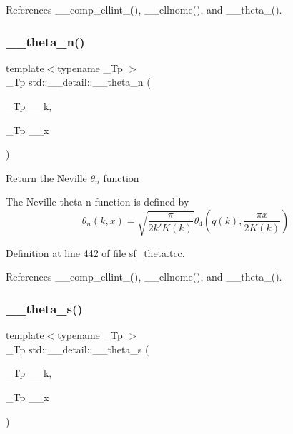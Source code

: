 References \+\_\+\+\_\+comp\+\_\+ellint\+\_(), \+\_\+\+\_\+ellnome(), and \+\_\+\+\_\+theta\+\_().

\mbox{\label{namespacestd_1_1____detail_aace76210c8f70761bb14ab602b88d027}} 
\subsubsection{\texorpdfstring{\+\_\+\+\_\+theta\+\_\+n()}{\_\_theta\_n()}}
{\footnotesize\ttfamily template$<$typename \+\_\+\+Tp $>$ \\
\+\_\+\+Tp std\+::\+\_\+\+\_\+detail\+::\+\_\+\+\_\+theta\+\_\+n (\begin{DoxyParamCaption}\item[{\+\_\+\+Tp}]{\+\_\+\+\_\+k,  }\item[{\+\_\+\+Tp}]{\+\_\+\+\_\+x }\end{DoxyParamCaption})}

Return the Neville $ \theta_n $ function

The Neville theta-\/n function is defined by \[ \theta_n(k,x) = \sqrt{\frac{\pi}{2k'K(k)}} \theta_4\left(q(k),\frac{\pi x}{2K(k)}\right) \] 

Definition at line 442 of file sf\+\_\+theta.\+tcc.



References \+\_\+\+\_\+comp\+\_\+ellint\+\_(), \+\_\+\+\_\+ellnome(), and \+\_\+\+\_\+theta\+\_().

\mbox{\label{namespacestd_1_1____detail_aeac5da2d394fafe6432871abf5c05413}} 
\subsubsection{\texorpdfstring{\+\_\+\+\_\+theta\+\_\+s()}{\_\_theta\_s()}}
{\footnotesize\ttfamily template$<$typename \+\_\+\+Tp $>$ \\
\+\_\+\+Tp std\+::\+\_\+\+\_\+detail\+::\+\_\+\+\_\+theta\+\_\+s (\begin{DoxyParamCaption}\item[{\+\_\+\+Tp}]{\+\_\+\+\_\+k,  }\item[{\+\_\+\+Tp}]{\+\_\+\+\_\+x }\end{DoxyParamCaption})}


